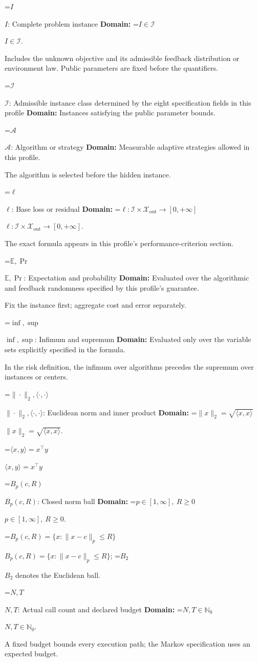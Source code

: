 \documentclass[10pt,a4paper]{article}
\newcommand{\AtlasMath}[1]{\par\begingroup\centering\setbox0=\hbox{$\displaystyle #1$}\ifdim\wd0>1.4\linewidth\typeout{ATLAS WIDE FORMULA: \the\wd0}\fi\ifdim\wd0>\linewidth\resizebox{\linewidth}{!}{\box0}\else\box0\fi\par\endgroup}
\newcommand{\AtlasInlineMath}[1]{\begingroup\setbox0=\hbox{$#1$}\ifdim\wd0>.4\linewidth\endgroup\AtlasMath{#1}\else\endgroup$#1$\fi}
\begin{document}
\AtlasInlineMath{I}: Complete problem instance \textbf{Domain:} \AtlasInlineMath{I\in\mathcal{I}}.

Includes the unknown objective and its admissible feedback distribution or environment law. Public parameters are fixed before the quantifiers.

\AtlasInlineMath{\mathcal{I}}: Admissible instance class determined by the eight specification fields in this profile \textbf{Domain:} Instances satisfying the public parameter bounds.

\AtlasInlineMath{\mathcal{A}}: Algorithm or strategy \textbf{Domain:} Measurable adaptive strategies allowed in this profile.

The algorithm is selected before the hidden instance.

\AtlasInlineMath{\ell}: Base loss or residual \textbf{Domain:} \AtlasInlineMath{\ell:\mathcal{I}\times\mathcal{X}_{\mathrm{out}}\to[0,+\infty]}.

The exact formula appears in this profile's performance-criterion section.

\AtlasInlineMath{\mathbb{E},\Pr}: Expectation and probability \textbf{Domain:} Evaluated over the algorithmic and feedback randomness specified by this profile's guarantee.

Fix the instance first; aggregate cost and error separately.

\AtlasInlineMath{\inf,\sup}: Infimum and supremum \textbf{Domain:} Evaluated only over the variable sets explicitly specified in the formula.

In the risk definition, the infimum over algorithms precedes the supremum over instances or centers.

\AtlasInlineMath{\|\cdot\|_2,\langle\cdot,\cdot\rangle}: Euclidean norm and inner product \textbf{Domain:} \AtlasInlineMath{\|x\|_2=\sqrt{\langle x,x\rangle}}.

\AtlasInlineMath{\langle x,y\rangle=x^\top y}

\AtlasInlineMath{B_p(c,R)}: Closed norm ball \textbf{Domain:} \AtlasInlineMath{p\in[1,\infty],\ R\ge0}.

\AtlasInlineMath{B_p(c,R)=\{x:\|x-c\|_p\le R\}}; \AtlasInlineMath{B_2} denotes the Euclidean ball.

\AtlasInlineMath{N,T}: Actual call count and declared budget \textbf{Domain:} \AtlasInlineMath{N,T\in\mathbb{N}_0}.

A fixed budget bounds every execution path; the Markov specification uses an expected budget.
\end{document}
